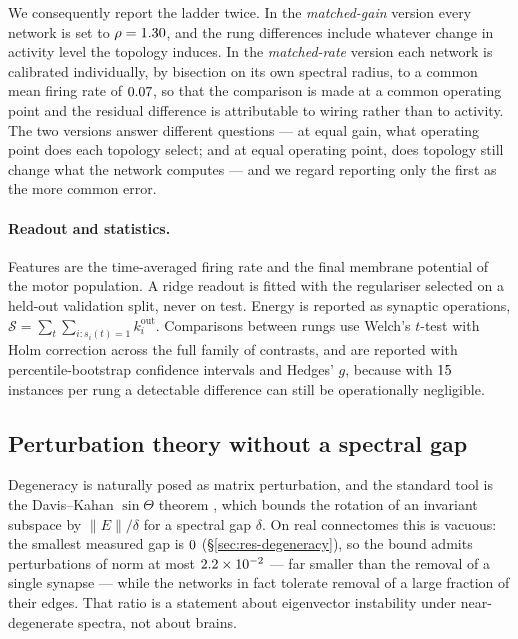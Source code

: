 We consequently report the ladder twice. In the \emph{matched-gain} version every
network is set to $\rho = 1.30$, and the rung differences include whatever
change in activity level the topology induces. In the \emph{matched-rate} version each
network is calibrated individually, by bisection on its own spectral radius, to a common
mean firing rate of $0.07$, so that the comparison is made at a common operating
point and the residual difference is attributable to wiring rather than to activity. The
two versions answer different questions --- at equal gain, what operating point does
each topology select; and at equal operating point, does topology still change what the
network computes --- and we regard reporting only the first as the more common error.

\paragraph{Readout and statistics.}
Features are the time-averaged firing rate and the final membrane potential of the
motor population. A ridge readout is fitted with the regulariser selected on a
held-out validation split, never on test. Energy is reported as synaptic operations,
$\mathcal{S} = \sum_t \sum_{i: s_i(t)=1} k^{\mathrm{out}}_i$. Comparisons between
rungs use Welch's $t$-test with Holm correction \cite{holm1979simple} across the full
family of contrasts, and are reported with percentile-bootstrap confidence intervals
and Hedges' $g$, because with $15$ instances per rung a detectable
difference can still be operationally negligible.

\subsection{Perturbation theory without a spectral gap}
\label{sec:theory}

Degeneracy is naturally posed as matrix perturbation, and the standard tool is the
Davis--Kahan $\sin\Theta$ theorem \cite{daviskahan1970rotation,stewart1990matrix},
which bounds the rotation of an invariant subspace by $\|E\|/\delta$ for a spectral
gap $\delta$. On real connectomes this is vacuous: the smallest measured gap is
$0$ (\S\ref{sec:res-degeneracy}), so the bound admits perturbations of
norm at most $2.2 \times 10^{-2}$ --- far smaller than the removal of a single synapse
--- while the networks in fact tolerate removal of a large fraction of their edges.
That ratio is a statement about eigenvector instability under near-degenerate
spectra, not about brains.

